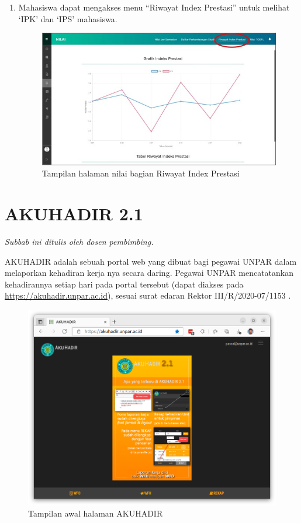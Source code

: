 \begin{enumerate}
\begin{enumerate}
\begin{figure}[H]
			\label{fig:nilai_2018}
		\end{figure}
		\item Mahasiswa dapat mengakses menu ``Riwayat Index Prestasi'' untuk melihat `IPK' dan `IPS' mahasiswa.
		\begin{figure}[H]
			\centering
			\includegraphics[scale=0.7]{Gambar/rip2018.jpg}
			\caption{Tampilan halaman nilai bagian Riwayat Index Prestasi} 
			\label{fig:rip_2018}
		\end{figure}
	\end{enumerate}	
\end{enumerate}
\newpage

\section{AKUHADIR 2.1}

\textit{Subbab ini ditulis oleh dosen pembimbing.}

AKUHADIR adalah sebuah portal web yang dibuat bagi pegawai UNPAR dalam melaporkan kehadiran kerja nya secara daring. Pegawai UNPAR mencatatankan kehadirannya setiap hari pada portal tersebut (dapat diakses pada \url{https://akuhadir.unpar.ac.id}), sesuai surat edaran Rektor III/R/2020-07/1153 \cite{akuhadir}.

\begin{figure}[H]
	\centering
	\includegraphics[scale=0.3]{Gambar/akuhadir-1-beranda.png}
	\caption{Tampilan awal halaman AKUHADIR} 
	\label{fig:akuhadir-1-beranda}
\end{figure}

